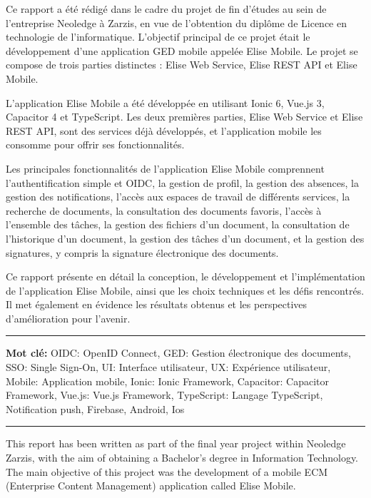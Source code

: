 
Ce rapport a été rédigé dans le cadre du projet de fin d'études au sein de l'entreprise Neoledge à Zarzis, en vue de l'obtention du diplôme de Licence en technologie de l'informatique. L'objectif principal de ce projet était le développement d'une application GED mobile appelée Elise Mobile. Le projet se compose de trois parties distinctes : Elise Web Service, Elise REST API et Elise Mobile.

L'application Elise Mobile a été développée en utilisant Ionic 6, Vue.js 3, Capacitor 4 et TypeScript. Les deux premières parties, Elise Web Service et Elise REST API, sont des services déjà développés, et l'application mobile les consomme pour offrir ses fonctionnalités.

Les principales fonctionnalités de l'application Elise Mobile comprennent l'authentification simple et OIDC, la gestion de profil, la gestion des absences, la gestion des notifications, l'accès aux espaces de travail de différents services, la recherche de documents, la consultation des documents favoris, l'accès à l'ensemble des tâches, la gestion des fichiers d'un document, la consultation de l'historique d'un document, la gestion des tâches d'un document, et la gestion des signatures, y compris la signature électronique des documents.

Ce rapport présente en détail la conception, le développement et l'implémentation de l'application Elise Mobile, ainsi que les choix techniques et les défis rencontrés. Il met également en évidence les résultats obtenus et les perspectives d'amélioration pour l'avenir.

\vspace{1cm}



\noindent\rule[2pt]{\textwidth}{0.5pt}

{\textbf{Mot clé:}}
OIDC: OpenID Connect, GED: Gestion électronique des documents, SSO: Single Sign-On, UI: Interface utilisateur, UX: Expérience utilisateur, Mobile: Application mobile, Ionic: Ionic Framework, Capacitor: Capacitor Framework, Vue.js: Vue.js Framework, TypeScript: Langage TypeScript, Notification push, Firebase, Android, Ios
\\
\noindent\rule[2pt]{\textwidth}{0.5pt}

This report has been written as part of the final year project within Neoledge Zarzis, with the aim of obtaining a Bachelor's degree in Information Technology. The main objective of this project was the development of a mobile ECM (Enterprise Content Management) application called Elise Mobile.

